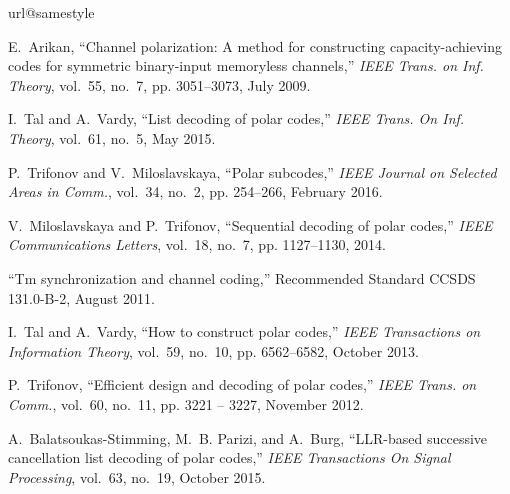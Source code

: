 \documentclass[conference]{IEEEtran}
\theoremstyle{plain}
\begin{document}

%
\begin{thebibliography}{10}
\providecommand{\url}[1]{#1}
\csname url@samestyle\endcsname
\providecommand{\newblock}{\relax}
\providecommand{\bibinfo}[2]{#2}
\providecommand{\BIBentrySTDinterwordspacing}{\spaceskip=0pt\relax}
\providecommand{\BIBentryALTinterwordstretchfactor}{4}
\providecommand{\BIBentryALTinterwordspacing}{\spaceskip=\fontdimen2\font plus
\BIBentryALTinterwordstretchfactor\fontdimen3\font minus
  \fontdimen4\font\relax}
\providecommand{\BIBforeignlanguage}[2]{{%
\expandafter\ifx\csname l@#1\endcsname\relax
\typeout{** WARNING: IEEEtran.bst: No hyphenation pattern has been}%
\typeout{** loaded for the language `#1'. Using the pattern for}%
\typeout{** the default language instead.}%
\else
\language=\csname l@#1\endcsname
\fi
#2}}
\providecommand{\BIBdecl}{\relax}
\BIBdecl

E.~Arikan, ``Channel polarization: A method for constructing capacity-achieving
  codes for symmetric binary-input memoryless channels,'' \emph{IEEE
  Trans. on Inf. Theory}, vol.~55, no.~7, pp. 3051--3073, July
  2009.

I.~Tal and A.~Vardy, ``List decoding of polar codes,'' \emph{IEEE Trans.
  On Inf. Theory}, vol.~61, no.~5, May 2015.

P.~Trifonov and V.~Miloslavskaya, ``Polar subcodes,'' \emph{IEEE Journal on
  Selected Areas in Comm.}, vol.~34, no.~2, pp. 254--266, February
  2016.

V.~Miloslavskaya and P.~Trifonov, ``Sequential decoding of polar codes,''
  \emph{IEEE Communications Letters}, vol.~18, no.~7, pp. 1127--1130, 2014.

``Tm synchronization and channel coding,'' Recommended Standard CCSDS
  131.0-B-2, August 2011.

I.~Tal and A.~Vardy, ``How to construct polar codes,'' \emph{IEEE Transactions
  on Information Theory}, vol.~59, no.~10, pp. 6562--6582, October 2013.

P.~Trifonov, ``Efficient design and decoding of polar codes,'' \emph{IEEE
  Trans. on Comm.}, vol.~60, no.~11, pp. 3221 -- 3227, November
  2012.

A.~Balatsoukas-Stimming, M.~B. Parizi, and A.~Burg, ``{LLR}-based successive
  cancellation list decoding of polar codes,'' \emph{IEEE Transactions On
  Signal Processing}, vol.~63, no.~19, October 2015.


\end{thebibliography}
\end{document}
